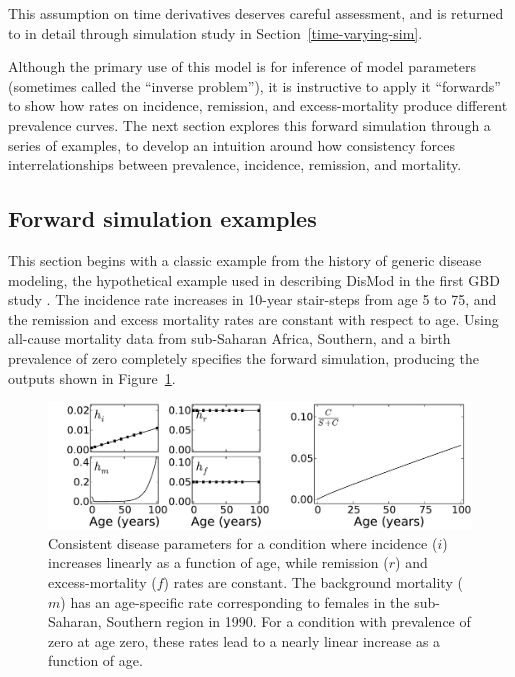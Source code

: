This assumption on time derivatives deserves careful assessment, and
is returned to in detail through simulation study in
Section~\ref{time-varying-sim}.

Although the primary use of this model is for inference of model
parameters (sometimes called the ``inverse problem''), it is
instructive to apply it ``forwards'' to show how rates on incidence,
remission, and excess-mortality produce different prevalence
curves. The next section explores this forward simulation through a
series of examples, to develop an intuition around how consistency
forces interrelationships between prevalence, incidence, remission,
and mortality.


\subsection{Forward simulation examples}

This section begins with a classic example from the history of generic
disease modeling, the hypothetical example used in describing DisMod
in the first GBD study
\cite{harvard_school_of_public_health.;world_health_organization.;world_bank._global_1996}
. The incidence rate increases in 10-year stair-steps from age 5 to
75, and the remission and excess mortality rates are constant with
respect to age.  Using all-cause mortality data from sub-Saharan
Africa, Southern, and a birth prevalence of zero completely specifies
the forward simulation, producing the outputs shown in
Figure~\ref{forward-sim-ex1}.

\begin{figure}[h]
\begin{center}
\includegraphics[width=\textwidth]{initial.pdf}
\caption{Consistent disease parameters for a condition where incidence
  ($i$) increases linearly as a function of age, while remission ($r$)
  and excess-mortality ($f$) rates are constant. The background
  mortality ($m$) has an age-specific rate corresponding to females in
  the sub-Saharan, Southern region in 1990. For a condition with
  prevalence of zero at age zero, these rates lead to a nearly linear
  increase as a function of age.}
\label{forward-sim-ex1}
\end{center}
\end{figure}

